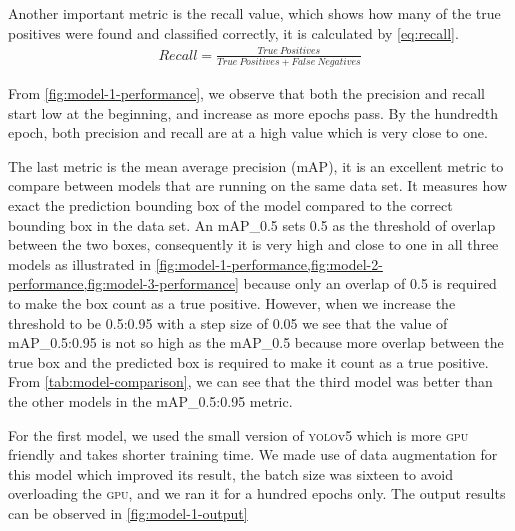 \documentclass[../main.tex]{subfiles}
\begin{document}
Another important metric is the recall value, which shows how many of the 
true positives were found and classified correctly, it is calculated by \cref{eq:recall}.
%
\begin{align}
    Recall =  \frac{True\ Positives}{True\ Positives + False\ Negatives} \label{eq:recall}
\end{align}

From \cref{fig:model-1-performance}, we observe that both the precision and recall start low 
at the beginning, and increase as more epochs pass. By the hundredth 
epoch, both precision and recall are at a high value which is very close 
to one.  


The last metric is the mean average precision (mAP), it is an excellent metric
to compare between models that are running on the same data set. It measures
how exact the prediction bounding box of the model compared to the correct
bounding box in the data set. An mAP\_0.5 sets 0.5 as the threshold of overlap 
between the two boxes, consequently it is very high and close to one in all 
three models as illustrated in 
\cref{fig:model-1-performance,fig:model-2-performance,fig:model-3-performance}
because only an overlap of 0.5 is required to make the box count as a true positive.
However, when we increase the threshold to be 0.5:0.95 with a step size of 0.05 we
see that the value of mAP\_0.5:0.95 is not so high as the mAP\_0.5 because more overlap
between the true box and the predicted box is required to make it count as a true
positive. From \cref{tab:model-comparison}, we can see that the third model was better 
than the other models in the mAP\_0.5:0.95 metric.

For the first model, we used the small version of \textsc{yolo}v5 which is 
more \textsc{gpu} friendly and takes shorter training time.
We made use of data augmentation for this model which improved its result,
the batch size was sixteen to avoid overloading the \textsc{gpu}, 
and we ran it for a hundred epochs only. The output results can be observed in 
\cref{fig:model-1-output}
\end{document}
